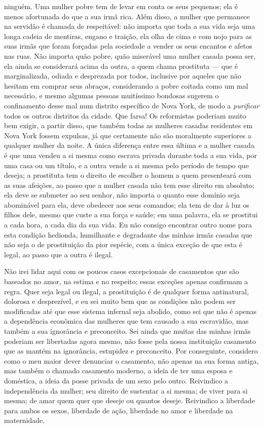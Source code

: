 ninguém. Uma mulher pobre tem de levar em conta os seus pequenos; ela é
menos afortunada do que a sua irmã rica. Além disso, a mulher que
permanece na servidão é chamada de respeitável: não importa que toda a
sua vida seja uma longa cadeia de mentiras, engano e traição, ela olha
de cima e com nojo para as suas irmãs que foram forçadas pela sociedade
a vender os seus encantos e afetos nas ruas. Não importa quão pobre,
quão miserável uma mulher casada possa ser, ela ainda se considerará
acima da outra, a quem chama prostituta --- que é marginalizada, odiada e
desprezada por todos, inclusive por aqueles que não hesitam em comprar
seus abraços, considerando a pobre coitada como um mal necessário, e
mesmo algumas pessoas muitíssimo bondosas sugerem o confinamento desse
mal num distrito específico de Nova York, de modo a \textit{purificar} todos
os outros distritos da cidade. Que farsa! Os reformistas poderiam muito
bem exigir, a partir disso, que também todas as mulheres casadas
residentes em Nova York fossem expulsas, já que certamente não são
moralmente superiores a qualquer mulher da noite. A única diferença
entre essa última e a mulher casada é que uma vendeu a si mesma como
escrava privada durante toda a sua vida, por uma casa ou um título, e a
outra vende a si mesma pelo período de tempo que deseja; a prostituta tem o
direito de escolher o homem a quem presenteará com as suas afeições, ao
passo que a mulher casada não tem esse direito em absoluto; ela deve se
submeter ao seu senhor, não importa o quanto esse domínio seja
abominável para ela, deve obedecer aos seus comandos; ela tem de
dar à luz os filhos dele, mesmo que custe a sua força e saúde; em uma palavra,
ela se prostitui a cada hora, a cada dia da sua vida. Eu não
consigo encontrar outro nome para esta condição hedionda, humilhante e
degradante das minhas irmãs casadas que não seja o de prostituição da pior
espécie, com a única exceção de que esta é legal, ao passo que a outra é ilegal.

Não irei lidar aqui com os poucos casos excepcionais de casamentos que
são baseados no amor, na estima e no respeito; essas exceções apenas
confirmam a regra. Quer seja legal ou ilegal, a prostituição é de
qualquer forma antinatural, dolorosa e desprezível, e eu sei muito bem
que as condições não podem ser modificadas até que esse sistema infernal
seja abolido, como sei que não é apenas a dependência econômica das
mulheres que tem causado a sua escravidão, mas também a sua ignorância e
preconceito. Sei ainda que muitas das minhas irmãs poderiam ser
libertadas agora mesmo, não fosse pela nossa instituição casamento que
as mantém na ignorância, estupidez e preconceito. Por conseguinte,
considero como o meu maior dever denunciar o casamento, não apenas na
sua forma antiga, mas também o chamado casamento moderno, a ideia de ter
uma esposa e doméstica, a ideia da posse privada de um sexo pelo outro.
Reivindico a independência da mulher; seu direito de sustentar a si
mesma; de viver para si mesma; de amar quem quer que deseje ou quantos
deseje. Reivindico a liberdade para ambos os sexos, liberdade de ação,
liberdade no amor e liberdade na maternidade.

